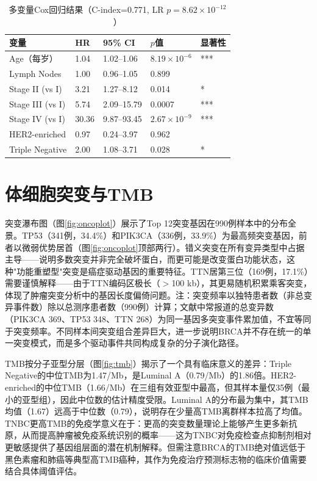 \documentclass[12pt,a4paper,openany]{ctexbook}
\begin{document}
\begin{table}[H]
\centering\caption{多变量Cox回归结果（C-index=0.771, LR $p=8.62\times10^{-12}$）}\label{tab:cox}
\begin{tabular}{lllll}\toprule
变量 & HR & 95\% CI & $p$值 & 显著性 \\\midrule
Age（每岁） & 1.04 & 1.02--1.06 & $8.19\times10^{-6}$ & *** \\
Lymph Nodes & 1.00 & 0.96--1.05 & 0.899 & \\
Stage II (vs I) & 3.21 & 1.27--8.12 & 0.014 & * \\
Stage III (vs I) & 5.74 & 2.09--15.79 & 0.0007 & *** \\
Stage IV (vs I) & 30.36 & 9.87--93.45 & $2.67\times10^{-9}$ & *** \\
HER2-enriched & 0.97 & 0.24--3.97 & 0.962 & \\
Triple Negative & 2.00 & 1.08--3.71 & 0.028 & * \\\bottomrule
\end{tabular}
\end{table}

\section{体细胞突变与TMB}
突变瀑布图（图\ref{fig:oncoplot}）展示了Top 12突变基因在990例样本中的分布全景。TP53（341例，34.4\%）和PIK3CA（336例，33.9\%）为最高频突变基因，前者以微弱优势居首（图\ref{fig:oncoplot}顶部两行）。错义突变在所有变异类型中占据主导——说明多数突变并非完全破坏蛋白，而更可能是改变蛋白功能状态，这种"功能重塑型"突变是癌症驱动基因的重要特征。TTN居第三位（169例，17.1\%）需要谨慎解释——由于TTN编码区极长（$>$100 kb），其更易随机积累乘客突变，体现了肿瘤突变分析中的基因长度偏倚问题。注：突变频率以独特患者数（非总变异事件数）除以总测序患者数（990例）计算；文献中常报道的总变异数（PIK3CA 369、TP53 348、TTN 268）为同一基因多突变事件累加值，不宜等同于突变频率。不同样本间突变组合差异巨大，进一步说明BRCA并不存在统一的单一突变模式，而是多个驱动事件共同构成复杂的分子演化路径。

TMB按分子亚型分层（图\ref{fig:tmb}）揭示了一个具有临床意义的差异：Triple Negative的中位TMB为1.47/Mb，是Luminal A（0.79/Mb）的1.86倍。HER2-enriched的中位TMB（1.66/Mb）在三组有效亚型中最高，但其样本量仅35例（最小的亚型组），因此中位数的估计精度受限。Luminal A的分布最为集中，其TMB均值（1.67）远高于中位数（0.79），说明存在少量高TMB离群样本拉高了均值。TNBC更高TMB的免疫学意义在于：更高的突变数量理论上能够产生更多新抗原，从而提高肿瘤被免疫系统识别的概率——这为TNBC对免疫检查点抑制剂相对更敏感提供了基因组层面的潜在机制解释。但需注意BRCA的TMB绝对值远低于黑色素瘤和肺癌等典型高TMB癌种，其作为免疫治疗预测标志物的临床价值需要结合具体阈值评估。
\end{document}
